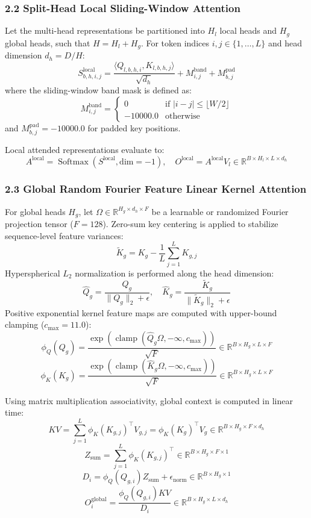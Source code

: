 \subsubsection{2.2 Split-Head Local Sliding-Window Attention}

Let the multi-head representations be partitioned into $H_l$ local heads and $H_g$ global heads, such that $H = H_l + H_g$.
For token indices $i, j \in \{1, \dots, L\}$ and head dimension $d_h = D / H$:$$S^{\text{local}}_{b, h, i, j} = \frac{\langle Q_{l, b, h, i}, K_{l, b, h, j} \rangle}{\sqrt{d_h}} + M^{\text{band}}_{i, j} + M^{\text{pad}}_{b, j}$$
where the sliding-window band mask is defined as:$$M^{\text{band}}_{i, j} = \begin{cases} 0 & \text{if } |i - j| \le \lfloor W / 2 \rfloor \\ -10000.0 & \text{otherwise} \end{cases}$$
and $M^{\text{pad}}_{b, j} = -10000.0$ for padded key positions.

Local attended representations evaluate to:$$A^{\text{local}} = \operatorname{Softmax}(S^{\text{local}}, \text{dim}=-1), \quad O^{\text{local}} = A^{\text{local}} V_l \in \mathbb{R}^{B \times H_l \times L \times d_h}$$

\subsubsection{2.3 Global Random Fourier Feature Linear Kernel Attention}

For global heads $H_g$, let $\Omega \in \mathbb{R}^{H_g \times d_h \times F}$ be a learnable or randomized Fourier projection tensor ($F = 128$).
Zero-sum key centering is applied to stabilize sequence-level feature variances:$$\widetilde{K}_g = K_g - \frac{1}{L} \sum_{j=1}^L K_{g, j}$$
Hyperspherical $L_2$ normalization is performed along the head dimension:$$\widehat{Q}_g = \frac{Q_g}{\|Q_g\|_2 + \epsilon}, \quad \widehat{K}_g = \frac{\widetilde{K}_g}{\|\widetilde{K}_g\|_2 + \epsilon}$$
Positive exponential kernel feature maps are computed with upper-bound clamping ($c_{\max} = 11.0$):$$\phi_Q(Q_g) = \frac{\exp\left(\operatorname{clamp}(\widehat{Q}_g \Omega, -\infty, c_{\max})\right)}{\sqrt{F}} \in \mathbb{R}^{B \times H_g \times L \times F}$$$$\phi_K(K_g) = \frac{\exp\left(\operatorname{clamp}(\widehat{K}_g \Omega, -\infty, c_{\max})\right)}{\sqrt{F}} \in \mathbb{R}^{B \times H_g \times L \times F}$$

Using matrix multiplication associativity, global context is computed in linear time:$$KV = \sum_{j=1}^L \phi_K(K_{g, j})^\top V_{g, j} = \phi_K(K_g)^\top V_g \in \mathbb{R}^{B \times H_g \times F \times d_h}$$$$Z_{\text{sum}} = \sum_{j=1}^L \phi_K(K_{g, j})^\top \in \mathbb{R}^{B \times H_g \times F \times 1}$$$$D_i = \phi_Q(Q_{g, i}) Z_{\text{sum}} + \epsilon_{\text{norm}} \in \mathbb{R}^{B \times H_g \times 1}$$$$O^{\text{global}}_i = \frac{\phi_Q(Q_{g, i}) KV}{D_i} \in \mathbb{R}^{B \times H_g \times L \times d_h}$$

